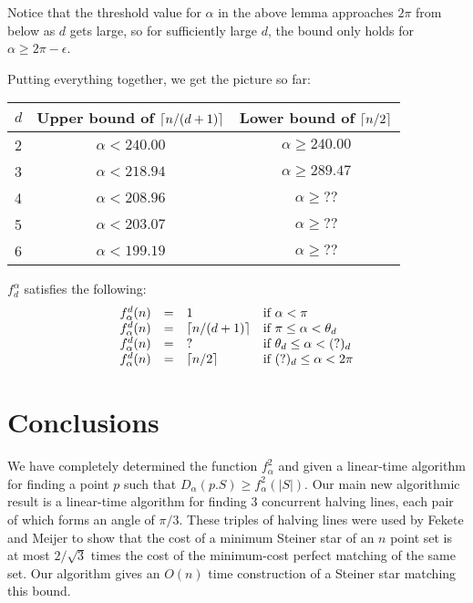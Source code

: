 \documentclass[lotsofwhite]{patmorin}
\newcommand{\crap}[1]{(?)_d}
\begin{document}
Notice that the threshold value for $\alpha$ in the above lemma
approaches $2\pi$ from below as $d$ gets large, so for sufficiently
large $d$, the bound only holds for $\alpha \ge 2\pi -\epsilon$.

Putting everything together, we get the picture so far:

\begin{tabular}{l|cc}
$d$ & Upper bound of $\left\lceil n/(d+1) \right\rceil$ & Lower bound of $\left\lceil n/2 \right\rceil$ \\
\hline
2 & $\alpha < 240.00$ & $\alpha \ge 240.00$ \\
3 & $\alpha < 218.94$ & $\alpha \ge 289.47$ \\
4 & $\alpha < 208.96$ & $\alpha \ge ??$ \\
5 & $\alpha < 203.07$ & $\alpha \ge ??$ \\
6 & $\alpha < 199.19$ & $\alpha \ge ??$ \\
\end{tabular}

\begin{lem}
$f^\alpha_d$ satisfies the following:
\[\begin{array}{lcll}
  f^d_\alpha(n) & = & 1 & \mbox{if $\alpha < \pi$} \\
  f^d_\alpha(n) & = & \ceil{n/(d+1)} & \mbox{if $\pi \le \alpha < \theta_d$} \\
  f^d_\alpha(n) & = & ? & \mbox{if $\theta_d \le \alpha < \crap{d}$} \\
  f^d_\alpha(n) & = & \ceil{n/2} & \mbox{if $\crap{d}\le \alpha < 2\pi$} \\
\end{array}\]
\end{lem}





\section{Conclusions}

We have completely determined the function $f^2_\alpha$ and given a
linear-time algorithm for finding a point $p$ such that
$D_\alpha(p.S)\ge f^2_\alpha(|S|)$.  Our main new algorithmic result
is a linear-time algorithm for finding 3 concurrent halving lines,
each pair of which forms an angle of $\pi/3$.  These triples of
halving lines were used by Fekete and Meijer to show that the cost of
a minimum Steiner star of an $n$ point set is at most $2/\sqrt{3}$
times the cost of the minimum-cost perfect matching of the same set.
Our algorithm gives an $O(n)$ time construction of a Steiner star
matching this bound.
\end{document}
